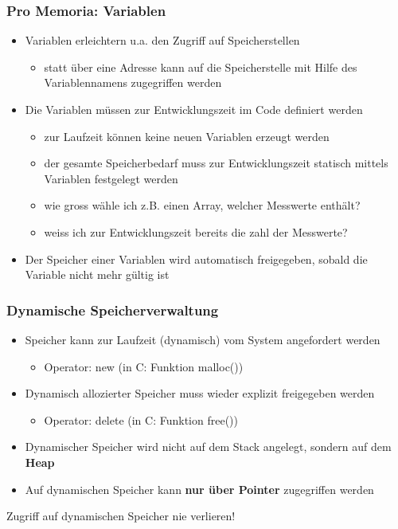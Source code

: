 \subsubsection{Pro Memoria: Variablen}
\label{sec:Pro Memoria: Variablen}
\begin{itemize}
	\item Variablen erleichtern u.a. den Zugriff auf Speicherstellen
	\begin{itemize}
		\item statt über eine Adresse kann auf die Speicherstelle mit Hilfe des Variablennamens zugegriffen werden
	\end{itemize}
	\item Die Variablen müssen zur Entwicklungszeit im Code definiert werden
	\begin{itemize}
		\item zur Laufzeit können keine neuen Variablen erzeugt werden
		\item der gesamte Speicherbedarf muss zur Entwicklungszeit statisch mittels Variablen festgelegt werden
		\item wie gross wähle ich z.B. einen Array, welcher Messwerte enthält?
		\item weiss ich zur Entwicklungszeit bereits die zahl der Messwerte?
	\end{itemize}
	\item Der Speicher einer Variablen wird automatisch freigegeben, sobald die Variable nicht mehr gültig ist
\end{itemize}

\subsubsection{Dynamische Speicherverwaltung}
\label{sec:Dynamische Speicherverwaltung 2}
\begin{itemize}
	\item Speicher kann zur Laufzeit (dynamisch) vom System angefordert werden
	\begin{itemize}
		\item Operator: new (in C: Funktion malloc())
	\end{itemize}
	\item Dynamisch allozierter Speicher muss wieder explizit freigegeben werden
	\begin{itemize}
		\item Operator: delete (in C: Funktion free())
	\end{itemize}
	\item Dynamischer Speicher wird nicht auf dem Stack angelegt, sondern auf dem \textbf{Heap}
	\item Auf dynamischen Speicher kann \textbf{nur über Pointer} zugegriffen werden
\end{itemize}
\begin{achtung}
Zugriff auf dynamischen Speicher nie verlieren!
\end{achtung}

